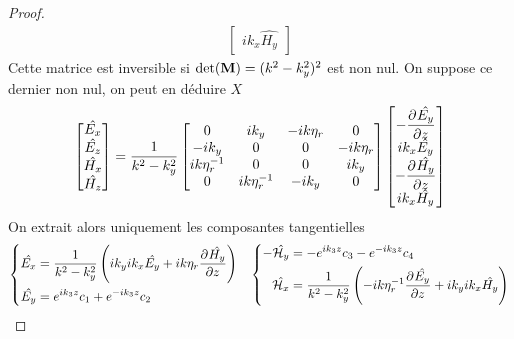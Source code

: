 \begin{proof}
\begin{align*}
\begin{bmatrix}
            ik_x\hat{H_y}
          \end{bmatrix}
        \end{align*}
        Cette matrice est inversible si \(\det(\mM) = (k^2 - k_y^2)^2 \) est non nul.
        On suppose ce dernier non nul, on peut en déduire \(X\)
        \begin{equation*}
          \begin{bmatrix}
            \hat{E_x}\\
            \hat{E_z}\\
            \hat{H_x}\\
            \hat{H_z}
          \end{bmatrix} =
          \frac{1}{k^2 - k_y^2}
          \begin{bmatrix}
          0 & ik_y & -ik \eta_r & 0
          \\
          -ik_y & 0 & 0 & -ik \eta_r
          \\
          ik \eta_r^{-1} & 0 & 0 & ik_y
          \\
          0 & ik \eta_r^{-1} & -ik_y & 0
          \end{bmatrix}
          \begin{bmatrix}
            -\ddr{z}{\hat{E_y}}\\
            ik_x\hat{E_y}\\
            -\ddr{z}{\hat{H_y}}\\
            ik_x\hat{H_y}
          \end{bmatrix}
        \end{equation*}
        On extrait alors uniquement les composantes tangentielles
        \begin{align*}
          \left\lbrace
          \begin{aligned}
            \hat{E_x} &= \frac{1}{k^2 - k_y^2}\left(ik_yik_x\hat{E_y} + ik\eta_r\ddr{z}{\hat{H_y}}\right)
            \\
            \hat{E_y} &= e^{ik_3z}c_1 + e^{-ik_3z}c_2
          \end{aligned}
          \right.
          &&
          \left\lbrace
          \begin{aligned}
            -\hat{\mathcal{H}_y} &= -e^{ik_3z}c_3 - e^{-ik_3z}c_4
            \\
            \hat{\mathcal{H}_x} &= \frac{1}{k^2 - k_y^2}\left(-ik\eta_r^{-1}\ddr{z}{\hat{E_y}} + ik_yik_x\hat{H_y}\right)
          \end{aligned}
          \right.
        \end{align*}

\end{proof}
